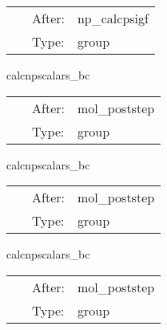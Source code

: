 \hspace{5mm}

 \begin{tabular*}{160mm}{cll} 
~ & After:  & np\_calcpsigf \\ 
~ & Type:  & group \\ 
\end{tabular*} 


\vspace{5mm}


\hspace{5mm} calcnpscalars\_bc 

\hspace{5mm}{\it boundary conditions } 


\hspace{5mm}

 \begin{tabular*}{160mm}{cll} 
~ & After:  & mol\_poststep \\ 
~ & Type:  & group \\ 
\end{tabular*} 


\vspace{5mm}


\hspace{5mm} calcnpscalars\_bc 

\hspace{5mm}{\it boundary conditions } 


\hspace{5mm}

 \begin{tabular*}{160mm}{cll} 
~ & After:  & mol\_poststep \\ 
~ & Type:  & group \\ 
\end{tabular*} 


\vspace{5mm}


\hspace{5mm} calcnpscalars\_bc 

\hspace{5mm}{\it boundary conditions } 


\hspace{5mm}

 \begin{tabular*}{160mm}{cll} 
~ & After:  & mol\_poststep \\ 
~ & Type:  & group \\ 
\end{tabular*} 


